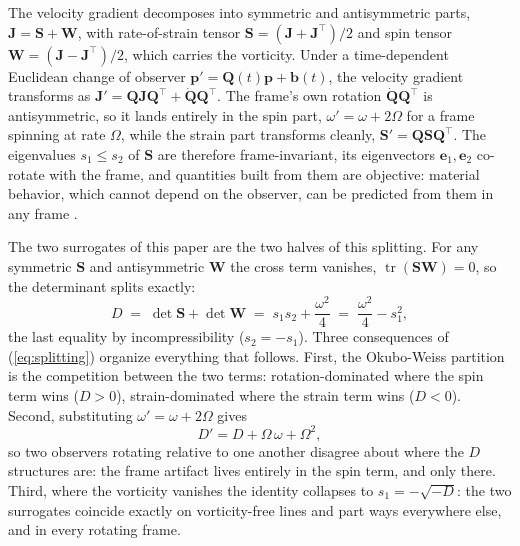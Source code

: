 \documentclass[lettersize,journal]{IEEEtran}
\begin{document}
The velocity gradient decomposes into symmetric and antisymmetric
parts, $\mathbf{J} = \mathbf{S} + \mathbf{W}$, with rate-of-strain
tensor $\mathbf{S} = (\mathbf{J} + \mathbf{J}^\top)/2$ and spin tensor
$\mathbf{W} = (\mathbf{J} - \mathbf{J}^\top)/2$, which carries the
vorticity. Under a time-dependent Euclidean change of observer
$\mathbf{p}' = \mathbf{Q}(t)\mathbf{p} + \mathbf{b}(t)$, the velocity
gradient transforms as $\mathbf{J}' = \mathbf{Q}\mathbf{J}
\mathbf{Q}^\top + \dot{\mathbf{Q}}\mathbf{Q}^\top$. The frame's own
rotation $\dot{\mathbf{Q}}\mathbf{Q}^\top$ is antisymmetric, so it
lands entirely in the spin part, $\omega' = \omega + 2\Omega$ for a
frame spinning at rate $\Omega$, while the strain part transforms
cleanly, $\mathbf{S}' = \mathbf{Q}\mathbf{S}\mathbf{Q}^\top$. The
eigenvalues $s_1 \leq s_2$ of $\mathbf{S}$ are therefore
frame-invariant, its eigenvectors $\mathbf{e}_1, \mathbf{e}_2$
co-rotate with the frame, and quantities built from them are objective:
material behavior, which cannot depend on the observer, can be
predicted from them in any frame \cite{16,17}.

The two surrogates of this paper are the two halves of this splitting.
For any symmetric $\mathbf{S}$ and antisymmetric $\mathbf{W}$ the cross
term vanishes, $\operatorname{tr}(\mathbf{S}\mathbf{W}) = 0$, so the
determinant splits exactly:
\begin{equation}
    D \;=\; \det\mathbf{S} + \det\mathbf{W}
      \;=\; s_1 s_2 + \frac{\omega^2}{4}
      \;=\; \frac{\omega^2}{4} - s_1^2,
    \label{eq:splitting}
\end{equation}
the last equality by incompressibility ($s_2 = -s_1$). Three
consequences of (\ref{eq:splitting}) organize everything that follows.
First, the Okubo-Weiss partition is the competition between the two
terms: rotation-dominated where the spin term wins ($D > 0$),
strain-dominated where the strain term wins ($D < 0$). Second,
substituting $\omega' = \omega + 2\Omega$ gives
\begin{equation}
    D' = D + \Omega\,\omega + \Omega^2,
    \label{eq:D_not_objective}
\end{equation}
so two observers rotating relative to one another disagree about where
the $D$ structures are: the frame artifact lives entirely in the spin
term, and only there. Third, where the vorticity vanishes the identity
collapses to $s_1 = -\sqrt{-D}$: the two surrogates coincide exactly on
vorticity-free lines and part ways everywhere else, and in every
rotating frame.
\end{document}
